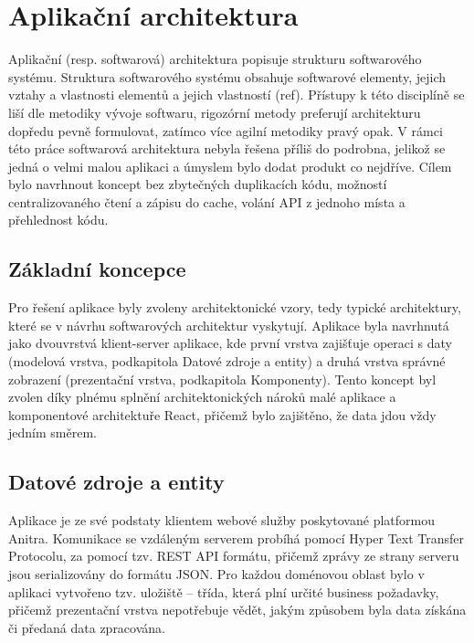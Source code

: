 \section{Aplikační architektura}


Aplikační (resp. softwarová) architektura popisuje strukturu softwarového systému. Struktura softwarového systému obsahuje softwarové elementy, jejich vztahy a vlastnosti elementů a jejich vlastností (ref). Přístupy k této disciplíně se liší dle metodiky vývoje softwaru, rigozórní metody preferují architekturu dopředu pevně formulovat, zatímco více agilní metodiky pravý opak. V rámci této práce softwarová architektura nebyla řešena příliš do podrobna, jelikož se jedná o velmi malou aplikaci a úmyslem bylo dodat produkt co nejdříve. Cílem bylo navrhnout koncept bez zbytečných duplikacích kódu, možností centralizovaného čtení a zápisu do cache, volání API z jednoho místa a přehlednost kódu.

\subsection{Základní koncepce}

Pro řešení aplikace byly zvoleny architektonické vzory, tedy typické architektury, které se v návrhu softwarových architektur vyskytují. Aplikace byla navrhnutá jako dvouvrstvá klient-server aplikace, kde první vrstva zajišťuje operaci s daty (modelová vrstva, podkapitola Datové zdroje a entity) a druhá vrstva správné zobrazení (prezentační vrstva, podkapitola Komponenty). Tento koncept byl zvolen díky plnému splnění architektonických nároků malé aplikace a komponentové architektuře React, přičemž bylo zajištěno, že data jdou vždy jedním směrem.

\subsection{Datové zdroje a entity}

Aplikace je ze své podstaty klientem webové služby poskytované platformou Anitra. Komunikace se vzdáleným serverem probíhá pomocí Hyper Text Transfer Protocolu, za pomocí tzv. REST API formátu, přičemž zprávy ze strany serveru jsou serializovány do formátu JSON. Pro každou doménovou oblast bylo v aplikaci vytvořeno tzv. uložiště -- třída, která plní určité business požadavky, přičemž prezentační vrstva nepotřebuje vědět, jakým způsobem byla data získána či předaná data zpracována.

